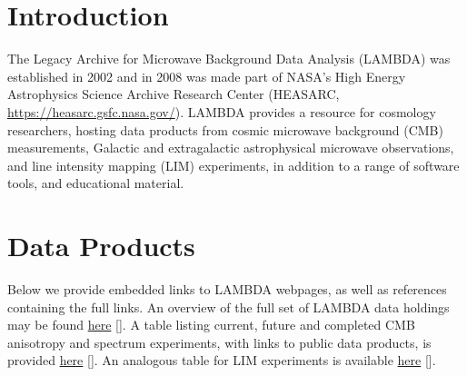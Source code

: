 \documentclass[twocolumn,tighten]{aastex631}
\begin{document}
\section{Introduction}

The Legacy Archive for Microwave Background Data Analysis (LAMBDA) was established in 2002 and in 2008 was made part of NASA's High Energy Astrophysics Science Archive Research Center (HEASARC, \href{https://heasarc.gsfc.nasa.gov/}{https://heasarc.gsfc.nasa.gov/}). LAMBDA provides a resource for cosmology researchers, hosting data products from cosmic microwave background (CMB) measurements, Galactic and extragalactic astrophysical microwave observations, and line intensity mapping (LIM) experiments, in addition to a range of software tools, and educational material.

\section{Data Products}

Below we provide embedded links to LAMBDA webpages, as well as references containing the full links. An overview of the full set of LAMBDA data holdings may be found \href{https://lambda.gsfc.nasa.gov/product/}{here} []. A table listing current, future and completed CMB anisotropy and spectrum experiments, with links to public data products, is provided \href{https://lambda.gsfc.nasa.gov/product/expt/}{here} []. An analogous table for LIM experiments is available \href{https://lambda.gsfc.nasa.gov/product/expt/lim_experiments.html}{here} [].
\end{document}
